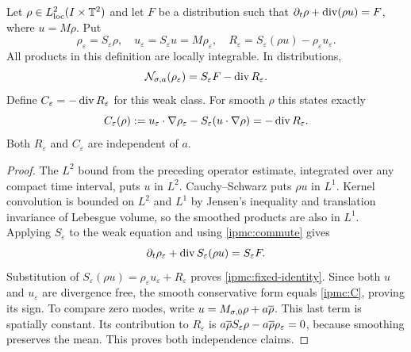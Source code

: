\begin{proposition}\label{ipmc:fixed}
Let $\rho\in L^2_{\rm loc}(I\times\mathbb T^2)$ and let $F$ be a distribution such
that $\partial_t\rho+\operatorname{div}(\rho u)=F$, where $u=M\rho$. Put
\[
\rho_\varepsilon=S_\varepsilon\rho,\quad
u_\varepsilon=S_\varepsilon u=M\rho_\varepsilon,\quad
R_\varepsilon=S_\varepsilon(\rho u)-\rho_\varepsilon u_\varepsilon.
\]
All products in this definition are locally integrable. In distributions,
\begin{equation}\label{ipmc:fixed-identity}
\mathcal N_{\sigma,a}(\rho_\varepsilon)
=S_\varepsilon F-\operatorname{div} R_\varepsilon.
\end{equation}
Define $C_\varepsilon=-\operatorname{div} R_\varepsilon$ for this weak class.
For smooth $\rho$ this states exactly
\begin{equation}\label{ipmc:C}
C_\varepsilon(\rho):=u_\varepsilon\cdot\nabla\rho_\varepsilon
-S_\varepsilon(u\cdot\nabla\rho)=-\operatorname{div} R_\varepsilon.
\end{equation}
Both $R_\varepsilon$ and $C_\varepsilon$ are independent of $a$.
\end{proposition}
\begin{proof}
The $L^2$ bound from the preceding operator estimate, integrated over any
compact time interval, puts $u$ in $L^2$. Cauchy--Schwarz puts $\rho u$
in $L^1$. Kernel convolution is bounded on $L^2$ and $L^1$ by Jensen's
inequality and translation invariance of Lebesgue volume, so the smoothed
products are also in $L^1$. Applying $S_\varepsilon$ to the weak equation
and using \eqref{ipmc:commute} gives
\[
\partial_t\rho_\varepsilon+\operatorname{div} S_\varepsilon(\rho u)=S_\varepsilon F.
\]
Substitution of $S_\varepsilon(\rho u)=\rho_\varepsilon u_\varepsilon
+R_\varepsilon$ proves \eqref{ipmc:fixed-identity}. Since both $u$ and
$u_\varepsilon$ are divergence free, the smooth conservative form equals
\eqref{ipmc:C}, proving its sign. To compare zero modes, write
$u=M_{\sigma,0}\rho+a\overline{\rho}$. This last term is spatially constant.
Its contribution to $R_\varepsilon$ is
$a\overline{\rho} S_\varepsilon\rho-a\overline{\rho}\rho_\varepsilon=0$,
because smoothing preserves the mean. This proves both independence claims.
\end{proof}

